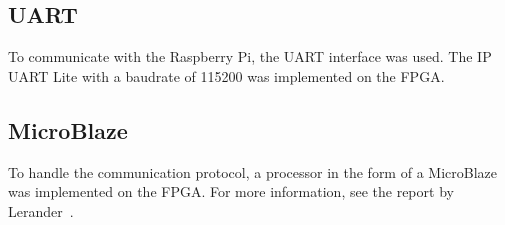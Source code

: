 \subsection{UART}
To communicate with the Raspberry Pi, the UART interface was used. The IP UART Lite with a baudrate of 115200 was implemented on the FPGA.

\subsection{MicroBlaze}
To handle the communication protocol, a processor in the form of a MicroBlaze was implemented on the FPGA. For more information, see the report by Lerander~\cite{lerander2017}.

